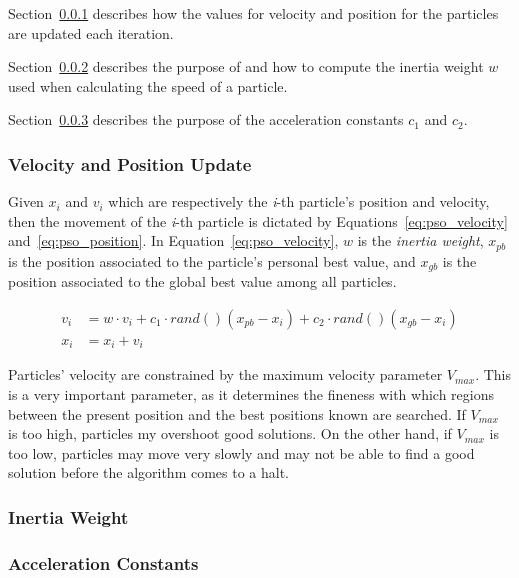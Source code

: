 Section~\ref{sec:5.pso.speed} describes how the values for velocity and position
for the particles are updated each iteration.

Section~\ref{sec:5.inertia} describes the purpose of and how to compute
the inertia weight $w$ used when calculating the speed of a particle.

Section~\ref{sec:5.pso.constants} describes the purpose of the acceleration
constants $c_1$ and $c_2$.

\subsubsection{Velocity and Position Update}
\label{sec:5.pso.speed}

Given $x_i$ and $v_i$ which are respectively the \textit{i}-th particle's position
and velocity, then the movement of the \textit{i}-th particle is dictated by
Equations~\ref{eq:pso_velocity} and~\ref{eq:pso_position}.
In Equation~\ref{eq:pso_velocity}, $w$ is the \textit{inertia weight},
$x_{pb}$ is the position associated to the particle's personal best value, 
and $x_{gb}$ is the position associated to the global best value among all particles.

\begin{align}
v_i &= w\cdot v_i + c_1 \cdot rand() \left(x_{pb}-x_i\right)+c_2\cdot rand() \left(x_{gb}-x_i\right) \label{eq:pso_velocity} \\
x_i &= x_i + v_i \label{eq:pso_position}
\end{align}

Particles' velocity are constrained by the maximum velocity parameter $V_{max}$.
This is a very important parameter, as it determines the fineness with which regions
between the present position and the best positions known are searched.
If $V_{max}$ is too high, particles my overshoot good solutions. On the other hand,
if $V_{max}$ is too low, particles may move very slowly and may not be able to find
a good solution before the algorithm comes to a halt.

\subsubsection{Inertia Weight}
\label{sec:5.inertia}


\subsubsection{Acceleration Constants}
\label{sec:5.pso.constants}

